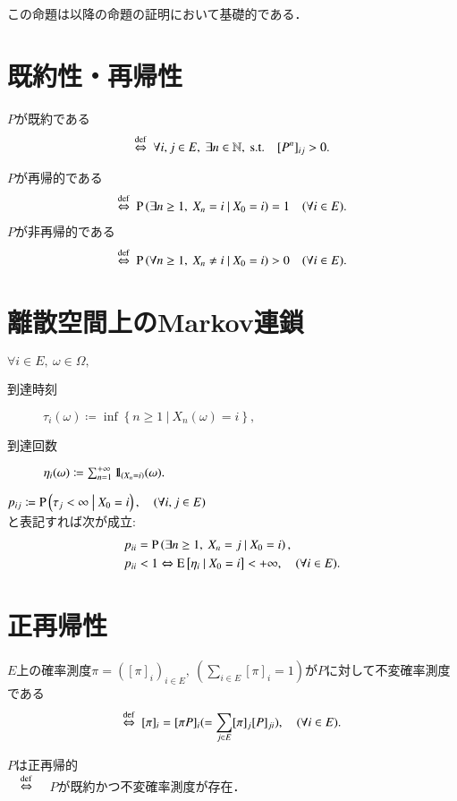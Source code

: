 	この命題は以降の命題の証明において基礎的である．

\section{既約性・再帰性}
	\begin{dfn}[既約性]
		$P$が既約である
		\begin{align}
			\overset{\mathrm{def}}{\Leftrightarrow}\ \forall i, j \in E,\ \exists n \in \mathbb{N},\ \mathrm{s.t. \quad} [P^n]_{ij} > 0.
		\end{align}
	\end{dfn}
	\begin{dfn}[再帰性]
		$P$が再帰的である
		\begin{align}
			\overset{\mathrm{def}}{\Leftrightarrow}\ \operatorname{P} \left( \exists n \geq 1,\ X_n = i \ \middle|\ X_0 = i \right) = 1 \quad(\forall i \in E).
		\end{align}
		$P$が非再帰的である
		\begin{align}
			\overset{\mathrm{def}}{\Leftrightarrow}\ \operatorname{P} \left( \forall n \geq 1,\ X_n \neq i \ \middle|\ X_0 = i \right) > 0 \quad(\forall i \in E).
		\end{align}
	\end{dfn}
	
\section{離散空間上のMarkov連鎖}
	\begin{dfn}[到達時刻と到達回数]
		$\forall i \in E,\ \omega \in \Omega,$
		\begin{description}
			\item[到達時刻] $\tau_i(\omega) \coloneqq \inf{}{\left\{ n \geq 1\ \left|\ X_n(\omega) = i \right.\right\}},$
			\item[到達回数] $\eta_i(\omega) \coloneqq \sum_{n=1}^{+\infty} \mbox{1}\hspace{-0.25em}\mbox{l}_{(X_n = i)}(\omega).$
		\end{description}
	\end{dfn}
	$p_{ij} \coloneqq \operatorname{P} \left( \tau_j < \infty \ \middle|\ X_0 = i \right), \quad (\forall i,j \in E)$\\
	と表記すれば次が成立:
	\begin{align}
		p_{ii} &= \operatorname{P} \left( \exists n \geq 1,\ X_n = j \ \middle|\ X_0 = i \right), \\
		p_{ii} &< 1 \Leftrightarrow \operatorname{E} \left[ \eta_i \ \middle|\ X_0 = i \right] < +\infty, \quad (\forall i \in E).
	\end{align}

\section{正再帰性}
	\begin{dfn}[不変確率測度]
		$E$上の確率測度$\pi = ([\pi]_i)_{i \in E},\ (\sum_{i \in E} [\pi]_i = 1)$が$P$に対して不変確率測度である
		\begin{align}
			\overset{\mathrm{def}}{\Leftrightarrow}\ [\pi]_i = [\pi P]_i ( = \sum_{j \in E}[\pi]_j [P]_{ji} ), \quad (\forall i \in E).
		\end{align}
	\end{dfn}
	\begin{dfn}[正再帰性]
		$P$は正再帰的 \\
		$\quad\overset{\mathrm{def}}{\Leftrightarrow}\quad$ $P$が既約かつ不変確率測度が存在． 
	\end{dfn}

